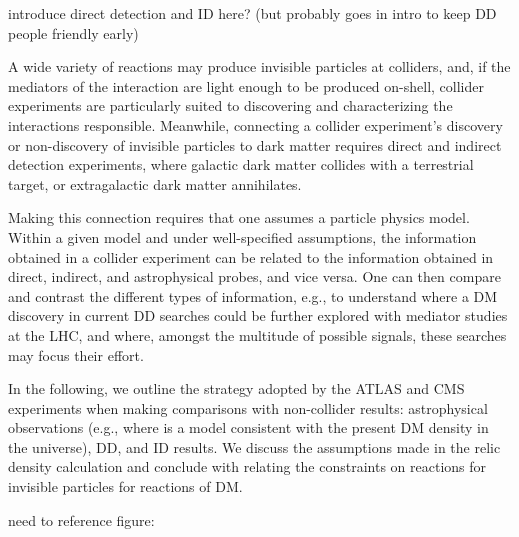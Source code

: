 
introduce direct detection and ID here? (but probably goes in intro to keep DD people friendly early)

A wide variety of reactions may produce invisible particles at colliders, and, if the mediators of the interaction are light enough to be produced on-shell, collider experiments are particularly suited to discovering and characterizing the interactions responsible.  Meanwhile, connecting a collider experiment's discovery or non-discovery of invisible particles to dark matter requires direct and indirect detection experiments, where galactic dark matter collides with a terrestrial target, or extragalactic dark matter annihilates.

Making this connection requires that one assumes a particle physics model.
Within a given model and under well-specified assumptions, the information obtained in a collider experiment can be related to the information obtained in direct, indirect, and astrophysical probes, and vice versa.
One can then compare and contrast the different types of information, e.g., to understand where a DM discovery in current DD searches could be further explored with mediator studies at the LHC, and where, amongst the multitude of possible signals, these searches may focus their effort.

In the following, we outline the strategy adopted by the ATLAS and CMS experiments when making comparisons with non-collider results: astrophysical observations (e.g., where is a model consistent with the present DM density in the universe), DD, and ID results. We discuss the assumptions made in the relic density calculation and conclude with relating the constraints on reactions for invisible particles for reactions of DM.




need to reference figure:



